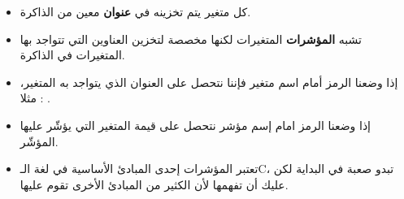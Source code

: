 \begin{itemize}
	\item كل متغير يتم تخزينه في
\textbf{عنوان}
معين من الذاكرة.
	\item تشبه
\textbf{المؤشرات}
المتغيرات لكنها مخصصة لتخزين العناوين التي تتواجد بها المتغيرات في الذاكرة.
	\item إذا وضعنا الرمز
\InlineCode{\&}
أمام اسم متغير فإننا نتحصل على العنوان الذي يتواجد به المتغير، مثلا :
.
	\item إذا وضعنا الرمز
\InlineCode{*}
امام إسم مؤشر نتحصل على قيمة المتغير التي يؤشّر عليها المؤشّر.
	\item تعتبر المؤشرات إحدى المبادئ الأساسية في لغة الـ\textenglish{C}، تبدو صعبة في البداية لكن عليك أن تفهمها لأن الكثير من المبادئ الأخرى تقوم عليها.
\end{itemize}
